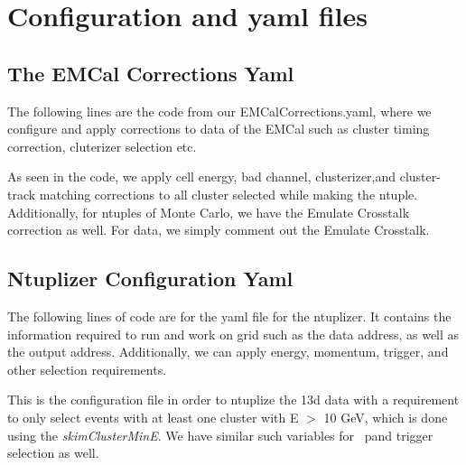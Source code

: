\section{Configuration and yaml files}
\label{Yaml}
\subsection{The EMCal Corrections Yaml}
The following lines are the code from our EMCalCorrections.yaml, where we configure and apply corrections to data of the EMCal such as cluster timing correction, cluterizer selection etc.

As seen in the code, we apply cell energy, bad channel, clusterizer,and cluster-track matching corrections to all cluster selected while making the ntuple. Additionally, for ntuples of Monte Carlo, we have the Emulate Crosstalk correction as well. For data, we simply comment out the Emulate Crosstalk.
\subsection{Ntuplizer Configuration Yaml} \label{ssec:config}
The following lines of code are for the yaml file for the ntuplizer. It contains the information required to run and work on grid such as the data address, as well as the output address. Additionally, we can apply energy, momentum, trigger, and other selection requirements.

This is the configuration file in order to ntuplize the 13d data with a requirement to only select events with at least one cluster with E $>$ 10 GeV, which is done using the \textit{skimClusterMinE}. We have similar such variables for \pt~pand trigger selection as well. 